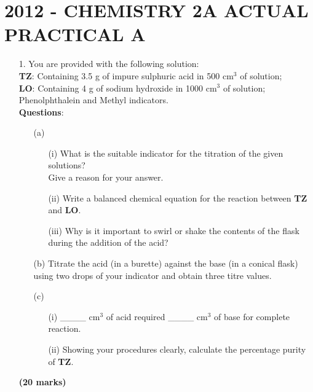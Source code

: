 \section{2012 - CHEMISTRY 2A ACTUAL PRACTICAL A} 

\begin{enumerate}
\item[1.] You are provided with the following solution:\\

\textbf{TZ}: Containing 3.5 g of impure sulphuric acid in 500 cm$^3$ of solution;\\
\textbf{LO}: Containing 4 g of sodium hydroxide in 1000 cm$^3$ of solution;\\
Phenolphthalein and Methyl indicators.\\

\textbf{Questions}:\\
\vspace{-4pt}
\begin{enumerate}
\item[(a)] 
\begin{enumerate}
\item[(i)] What is the suitable indicator for the titration of the given solutions?\\
Give a reason for your answer.
\item[(ii)] Write a balanced chemical equation for the reaction between \textbf{TZ} and \textbf{LO}.
\item[(iii)] Why is it important to swirl or shake the contents of the flask during the addition of the acid?\\
\end{enumerate}
\vspace{-4pt}
\item[(b)] Titrate the acid (in a burette) against the base (in a conical flask) using two drops of your indicator and obtain three titre values.\\
\vspace{-4pt}
\item[(c)] 
\begin{enumerate}
\item[(i)] \_\_\_\_ cm$^3$ of acid required \_\_\_\_ cm$^3$ of base for complete reaction.
\item[(ii)] Showing your procedures clearly, calculate the percentage purity of \textbf{TZ}.
\end{enumerate}

\end{enumerate}
\raggedleft \textbf{(20 marks)}


\end{enumerate}
